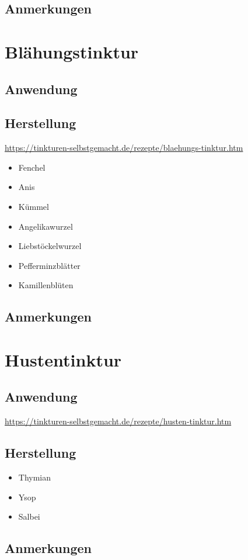 \subsection{Anmerkungen}







\section{Blähungstinktur}

\subsection{Anwendung}


\subsection{Herstellung}

\cite{tinkturen}  \url{https://tinkturen-selbstgemacht.de/rezepte/blaehungs-tinktur.htm}

\begin{itemize}
	\item Fenchel
	\item Anis
	\item Kümmel
	\item Angelikawurzel
	\item Liebstöckelwurzel
	\item Pefferminzblätter
	\item Kamillenblüten
\end{itemize}

\subsection{Anmerkungen}




\section{Hustentinktur}

\subsection{Anwendung}

\cite{tinkturen}  \url{https://tinkturen-selbstgemacht.de/rezepte/husten-tinktur.htm} 

\subsection{Herstellung}


\begin{itemize}
	\item Thymian
	\item Ysop
	\item Salbei
\end{itemize}

\subsection{Anmerkungen}